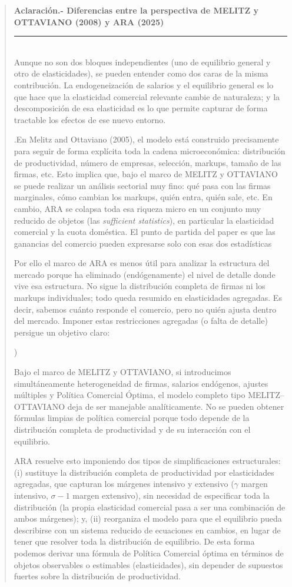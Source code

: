 \documentclass[10pt,a4paper]{article}
\newcounter{alphaitem}
\newenvironment{la}
      {\begin{list}{\alph{alphaitem})}{%
          \usecounter{alphaitem}%
          \setlength{\leftmargin}{1cm}%
          \setlength{\parskip}{3pt}%
          \setlength{\itemsep}{0pt}%
          \setlength{\parsep}{0pt}%
      }}
      {\end{list}}
\newenvironment{specialblock}[1]{%
      \begin{quote} %
      \small %
      \noindent\textbf{#1}\\[-0.3em] %
      \rule{\linewidth}{0.4pt}\\[0.6em]}{
      \end{quote}}
\begin{document}
\begin{specialblock}{\textbf{Aclaración}.- Diferencias entre la perspectiva de MELITZ y OTTAVIANO (2008) y ARA (2025)}
    Aunque no son dos bloques independientes (uno de equilibrio general y otro de elasticidades), se pueden entender como dos caras de la misma contribución. La endogeneización de salarios y el equilibrio general es lo que hace que la elasticidad comercial relevante cambie de naturaleza; y la descomposición de esa elasticidad es lo que permite capturar de forma tractable los efectos de ese nuevo entorno.

    .En Melitz and Ottaviano (2005), el modelo está construido precisamente para seguir de forma explícita toda la cadena microeconómica: distribución de productividad, número de empresas, selección, markups, tamaño de las firmas, etc. Esto implica que, bajo el marco de MELITZ y OTTAVIANO se puede realizar un análisis sectorial muy fino: qué pasa con las firmas marginales, cómo cambian los markups, quién entra, quién sale, etc.  En cambio, ARA se colapsa toda esa riqueza micro en un conjunto muy reducido de objetos (las \textit{sufficient statistics}), en particular la elasticidad comercial y la cuota doméstica. El punto de partida del paper es que las ganancias del comercio pueden expresarse solo con esas dos estadísticas  
    
    Por ello el marco de ARA es menos útil para analizar la estructura del mercado porque ha eliminado (endógenamente) el nivel de detalle donde vive esa estructura. No sigue la distribución completa de firmas ni los markups individuales; todo queda resumido en elasticidades agregadas. Es decir, sabemos cuánto responde el comercio, pero no quién ajusta dentro del mercado. Imponer estas restricciones agregadas (o falta de detalle) persigue un objetivo claro:
    \begin{la}
        \item Bajo el marco de MELITZ y OTTAVIANO, si introducimos simultáneamente heterogeneidad de firmas, salarios endógenos, ajustes múltiples y Política Comercial Óptima, el modelo completo tipo MELITZ–OTTAVIANO deja de ser manejable analíticamente. No se pueden obtener fórmulas limpias de política comercial porque todo depende de la distribución completa de productividad y de su interacción con el equilibrio.
        \item ARA resuelve esto imponiendo dos tipos de simplificaciones estructurales: (i) sustituye la distribución completa de productividad por elasticidades agregadas, que capturan los márgenes intensivo y extensivo ($\gamma$ margen intensivo, $\sigma-1$ margen extensivo), sin necesidad de especificar toda la distribución (la propia elasticidad comercial pasa a ser una combinación de ambos márgenes); y, (ii) reorganiza el modelo para que el equilibrio pueda describirse con un sistema reducido de ecuaciones en cambios, en lugar de tener que resolver toda la distribución de equilibrio. De esta forma podemos derivar una fórmula de Política Comercial óptima en términos de objetos observables o estimables (elasticidades), sin depender de supuestos fuertes sobre la distribución de productividad. 
    \end{la}
\end{specialblock}
\end{document}
